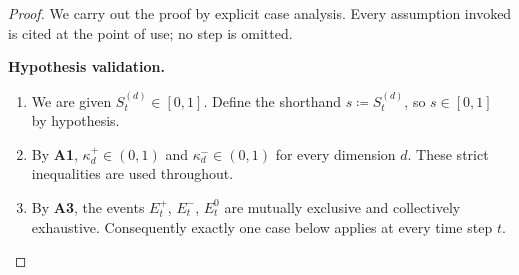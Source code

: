 \documentclass[12pt,openany]{book}
\numberwithin{equation}{chapter}
\theoremstyle{plain}
\theoremstyle{definition}
\theoremstyle{remark}
\def\mathcal#1{#1}%
\begin{document}
\begin{proof}
We carry out the proof by explicit case analysis.  Every assumption
invoked is cited at the point of use; no step is omitted.

\medskip
\noindent\textbf{Hypothesis validation.}
\begin{enumerate}
  \item We are given $\mathcal{S}_t^{(d)} \in [0,1]$.  Define the
    shorthand $s \coloneqq \mathcal{S}_t^{(d)}$, so $s \in [0,1]$
    by hypothesis.
  \item By \textbf{A1}, $\kappa_d^{+} \in (0,1)$ and
    $\kappa_d^{-} \in (0,1)$ for every dimension $d$.  These strict
    inequalities are used throughout.
  \item By \textbf{A3}, the events $E_t^{+}$, $E_t^{-}$, $E_t^{0}$
    are mutually exclusive and collectively exhaustive.  Consequently
    exactly one case below applies at every time step $t$.
\end{enumerate}


\end{proof}
\end{document}
